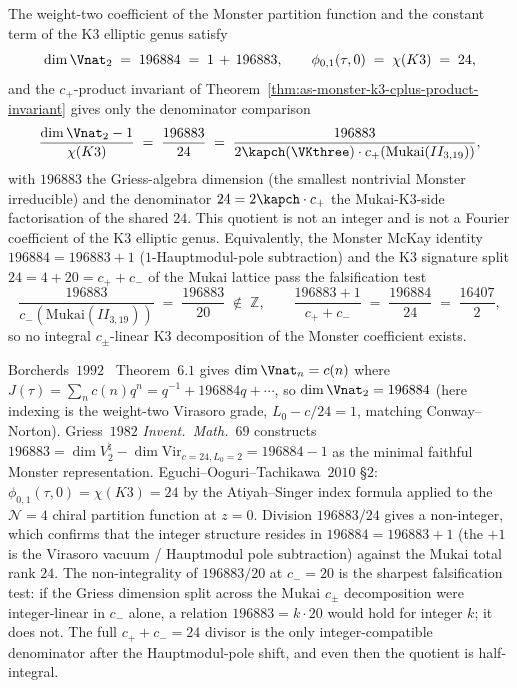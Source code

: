 \begin{remark}
\label{cor:as-monster-196884-as-cplus-weighted}
%
%
The weight-two coefficient of the Monster partition function and
the constant term of the K$3$ elliptic genus satisfy
\begin{equation}
\label{eq:as-monster-196884-cplus}
 \dim \Vnat_2
 \;=\;
 196884
 \;=\;
 1 \,+\, 196883,
 \qquad
 \phi_{0, 1}(\tau, 0)
 \;=\;
 \chi(K3)
 \;=\;
 24,
\end{equation}
and the $c_+$-product invariant of
Theorem~\ref{thm:as-monster-k3-cplus-product-invariant} gives only
the denominator comparison
\begin{equation}
\label{eq:as-cplus-weighted-moonshine}
 \frac{\dim \Vnat_2 - 1}{\chi(K3)}
 \;=\;
 \frac{196883}{24}
 \;=\;
 \frac{196883}{2 \kapch(\VKthree) \cdot c_+(\mathrm{Mukai}(II_{3, 19}))},
\end{equation}
with $196883$ the Griess-algebra dimension
(the smallest nontrivial Monster irreducible) and the denominator
$24 = 2 \kapch \cdot c_+$ the Mukai-K$3$-side factorisation of
the shared $24$. This quotient is not an integer and is not a
Fourier coefficient of the K$3$ elliptic genus. Equivalently, the
Monster McKay identity
$196884 = 196883 + 1$ ($1$-Hauptmodul-pole subtraction) and the
K$3$ signature split $24 = 4 + 20 = c_+ + c_-$ of the Mukai
lattice pass the falsification test
\begin{equation}
\label{eq:as-griess-over-mukai-ratio}
 \frac{196883}{c_-(\mathrm{Mukai}(II_{3, 19}))}
 \;=\;
 \frac{196883}{20}
 \;\notin\; \mathbb Z,
 \qquad
 \frac{196883 + 1}{c_+ + c_-}
 \;=\;
 \frac{196884}{24}
 \;=\;
 \frac{16407}{2},
\end{equation}
so no integral $c_\pm$-linear K$3$ decomposition of the Monster
coefficient exists.

Borcherds~$1992$~\cite{Bor92} Theorem~$6.1$ gives
$\dim \Vnat_n = c(n)$ where
$J(\tau) = \sum_n c(n) q^n = q^{-1} + 196884 q + \cdots$, so
$\dim \Vnat_2 = 196884$ (here indexing is the weight-two Virasoro
grade, $L_0 - c/24 = 1$, matching Conway--Norton). Griess~$1982$
\emph{Invent.\ Math.}~$69$ constructs $196883 = \dim V_2^\natural
- \dim \mathrm{Vir}_{c = 24, L_0 = 2} = 196884 - 1$ as the
minimal faithful Monster representation. Eguchi--Ooguri--Tachikawa~$2010$
\S$2$: $\phi_{0, 1}(\tau, 0) = \chi(K3) = 24$ by the
Atiyah--Singer index formula applied to the $\mathcal N{=}4$
chiral partition function at $z = 0$. Division
$196883/24$ gives a non-integer, which confirms that the
integer structure resides in $196884 = 196883 + 1$ (the $+1$ is
the Virasoro vacuum / Hauptmodul pole subtraction) against the
Mukai total rank $24$. The non-integrality of $196883/20$ at
$c_- = 20$ is the sharpest falsification test: if the Griess
dimension split across the Mukai $c_\pm$ decomposition were
integer-linear in $c_-$ alone, a relation $196883 = k \cdot 20$
would hold for integer $k$; it does not. The full $c_+ + c_- = 24$
divisor is the only integer-compatible denominator after the
Hauptmodul-pole shift, and even then the quotient is half-integral.
\end{remark}

